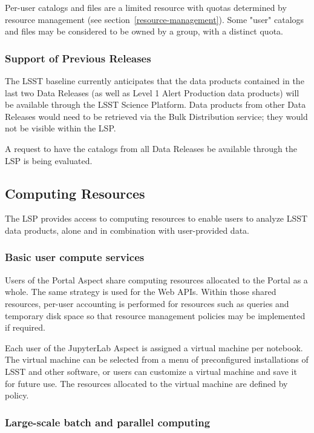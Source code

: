 Per-user catalogs and files are a limited resource with quotas determined by
resource management (see section~\ref{resource-management}).  Some "user"
catalogs and files may be considered to be owned by a group, with a distinct
quota.

\subsubsection{Support of Previous Releases}\label{support-of-previous-releases}

The LSST baseline currently anticipates that the data products contained in the
last two Data Releases (as well as Level 1 Alert Production data products) will
be available through the LSST Science Platform.  Data products from other Data
Releases would need to be retrieved via the Bulk Distribution service; they
would not be visible within the LSP.

A request to have the catalogs from all Data Releases be available through
the LSP is being evaluated.

\subsection{Computing Resources}\label{computing-resources}

The LSP provides access to computing resources to enable users to analyze
LSST data products, alone and in combination with user-provided data.

\subsubsection{Basic user compute services}\label{basic-user-compute-services}

Users of the Portal Aspect share computing resources allocated to the Portal as
a whole.  The same strategy is used for the Web APIs.  Within those shared
resources, per-user accounting is performed for resources such as queries and
temporary disk space so that resource management policies may be implemented
if required.

Each user of the JupyterLab Aspect is assigned a virtual machine per notebook.
The virtual machine can be selected from a menu of preconfigured installations
of LSST and other software, or users can customize a virtual machine and save
it for future use.  The resources allocated to the virtual machine are
defined by policy.

\subsubsection{Large-scale batch and parallel computing}\label{large-scale-batch-and-parallel-computing}

